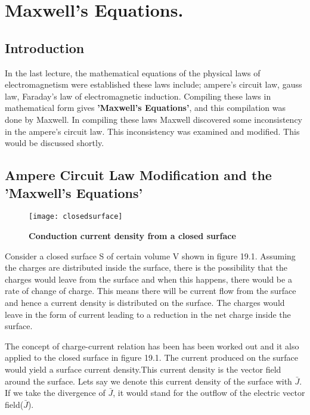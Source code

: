 \chapter{Maxwell's Equations.}
	\section{Introduction}
	In the last lecture, the mathematical equations of the physical laws of electromagnetism were established these laws include; ampere's circuit law, gauss law, Faraday's law of electromagnetic induction. Compiling these laws in mathematical form gives \textbf{'Maxwell's Equations'}, and this compilation was done by Maxwell. In compiling these laws Maxwell discovered some inconsistency in the ampere's circuit law. This inconsistency was examined and modified. This  would be discussed shortly.
	\section{Ampere Circuit Law Modification and the 'Maxwell's Equations'}
	\begin{figure}[h]
		\centering
		\texttt{[image: closedsurface]}
		\caption{\textbf{Conduction current density from a closed surface}}
	\end{figure}
 
 
 
 Consider a closed surface S of certain volume V shown in figure 19.1. Assuming the charges are distributed inside the surface, there is the possibility that the charges would leave from the surface and when this happens, there would be a rate of change of charge. This means there will be current flow from the surface and hence a current density is distributed on the surface. The charges would leave in the form of current leading to a reduction in the net charge inside the surface.
 
 
 The concept of charge-current relation has been has been worked out and it also applied to the closed surface in figure 19.1. The current produced on the surface would yield a surface current density.This current density is the vector field around the surface. Lets say we denote this current density of the surface with $\bar{J}$. If we take the divergence of $\bar{J}$, it would stand for the outflow of the electric vector field($\bar{J}$).
 
